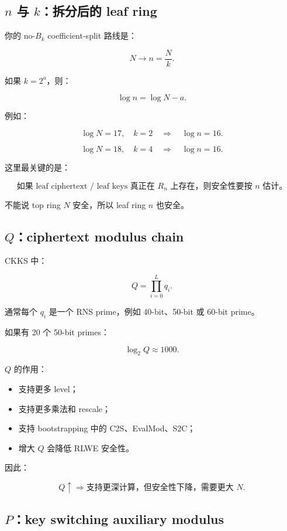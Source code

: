 \documentclass[UTF8,11pt,a4paper]{ctexart}
\begin{document}
\subsection{$n$ 与 $k$：拆分后的 leaf ring}

你的 no-$B_k$ coefficient-split 路线是：

\[
N \longrightarrow n=\frac{N}{k}.
\]

如果 $k=2^a$，则：

\[
\log n = \log N - a.
\]

例如：

\[
\log N=17,\quad k=2
\quad\Longrightarrow\quad
\log n=16.
\]

\[
\log N=18,\quad k=4
\quad\Longrightarrow\quad
\log n=16.
\]

这里最关键的是：

\[
\boxed{
\text{如果 leaf ciphertext / leaf keys 真正在 } R_n \text{ 上存在，则安全性要按 } n \text{ 估计。}
}
\]

不能说 top ring $N$ 安全，所以 leaf ring $n$ 也安全。

\subsection{$Q$：ciphertext modulus chain}

CKKS 中：

\[
Q = \prod_{i=0}^{L} q_i.
\]

通常每个 $q_i$ 是一个 RNS prime，例如 40-bit、50-bit 或 60-bit prime。

如果有 20 个 50-bit primes：

\[
\log_2 Q \approx 1000.
\]

$Q$ 的作用：
\begin{itemize}[leftmargin=2em]
    \item 支持更多 level；
    \item 支持更多乘法和 rescale；
    \item 支持 bootstrapping 中的 C2S、EvalMod、S2C；
    \item 增大 $Q$ 会降低 RLWE 安全性。
\end{itemize}

因此：

\[
\boxed{
Q \uparrow \Rightarrow \text{支持更深计算，但安全性下降，需要更大 } N.
}
\]

\subsection{$P$：key switching auxiliary modulus}
\end{document}

